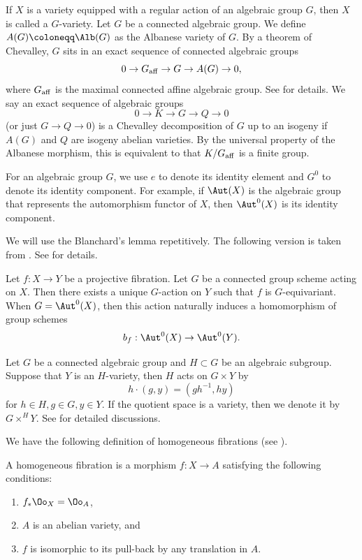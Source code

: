 \documentclass[11pt]{amsart}
\begin{document}
 If \( X \) is a variety equipped with a regular action of an algebraic group \( G \), then \( X \) is called a \( G \)-variety. Let \( G \) be a connected algebraic group. We define \( A(G) \coloneqq \Alb(G) \) as the Albanese variety of \( G \). By a theorem of Chevalley, $G$ sits in an exact sequence of connected algebraic groups
\[
0 \to G_{\rm aff} \to G \to A(G) \to 0,
\] where $G_{\rm aff}$ is the maximal connected affine algebraic group. See \cite[\S 2]{BSU13} for details. We say an exact sequence of algebraic groups
\[
0 \to K \to G \to Q \to 0
\] (or just $G \to Q \to 0 $) is a Chevalley decomposition of $G$ up to an isogeny if $A(G)$ and $Q$ are isogeny abelian varieties. By the universal property of the Albanese morphism, this is equivalent to that $K/G_{\rm aff}$ is a finite group.

For an algebraic group $G$, we use $e$ to denote its identity element and $G^0$ to denote its identity component. For example, if $\Aut(X)$ is the algebraic group that represents the automorphism functor of $X$, then $\Aut^0(X)$ is its identity component.

We will use the Blanchard's lemma repetitively. The following version is taken from \cite[Proposition 4.2.1, Corollary 4.2.6 ]{BSU13}. See \cite[\S 4]{BSU13} for details.

\begin{lemma}\label{lem: Blanchard}
Let $f: X \to Y$ be a projective fibration. Let $G$ be a connected group scheme acting on $X$. Then there exists a unique $G$-action on $Y$ such that $f$ is $G$-equivariant. When $G = \Aut^0(X)$, then this action naturally induces a homomorphism of group schemes
\[
b_f: \Aut^0(X) \to \Aut^0(Y).
\]
\end{lemma}

Let $G$ be a connected algebraic group and $H\subset G$ be an algebraic subgroup. Suppose that $Y$ is an $H$-variety, then $H$ acts on $G \times Y$ by
\begin{equation}\label{eq: action}
  h \cdot (g, y)= (gh^{-1}, h y)  
\end{equation}
for $h\in H, g\in G, y\in Y$. If the quotient space is a variety, then we denote it by $G \times^H Y$. See \cite[\S 2.5]{Bri17} for detailed discussions.


We have the following definition of homogeneous fibrations (see \cite[Definition 1.1]{Bri12}).

\begin{definition}\label{def: homogeneous fibration}
A homogeneous fibration is a morphism $f: X \to A$ satisfying the following conditions:
\begin{enumerate}
\item $f_*\Oo_X = \Oo_A$,
\item $A$ is an abelian variety, and
\item $f$ is isomorphic to its pull-back by any translation in $A$.
\end{enumerate}
\end{definition}
\end{document}
